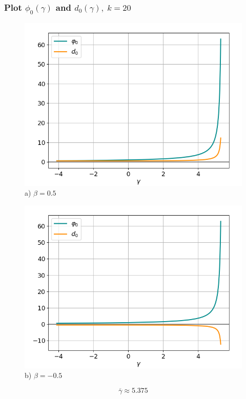 \documentclass[fullscreen=true, unicode, bookmarks=false]{beamer}
\begin{document}
\begin{frame}
\frametitle{ Plot $ \phi_0(\gamma) $ and $ d_0(\gamma), \; k = 20 $ }

\begin{figure} 
\begin{minipage}[h]{0.49\linewidth}
\begin{center}
\includegraphics[scale=0.39]{divergent_phid_x0_039_beta_05.png} \\ {\scriptsize a) $ \beta = 0.5 $}
\end{center}
\end{minipage} 
\hfill
\begin{minipage}[h]{0.49\linewidth}
\begin{center}
\includegraphics[scale=0.39]{divergent_phid_x0_039_beta_-05.png}  \\ {\scriptsize b) $ \beta = -0.5 $}
\end{center}
\end{minipage} 
\end{figure}
$$ \overline{\gamma} \approx 5.375 $$

\end{frame}
\end{document}

